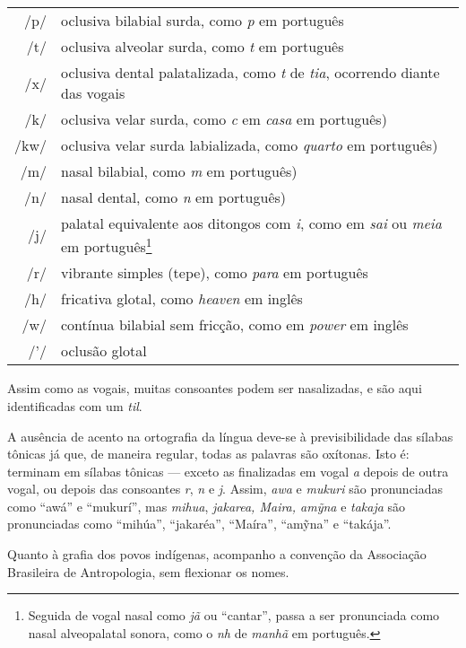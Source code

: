 \begin{tabular}{rl}
/p/ & oclusiva bilabial surda, como \textit{p} em português\\
/t/ & oclusiva alveolar surda, como \textit{t} em português\\
/x/ & oclusiva dental palatalizada, como \textit{t} de \textit{tia}, ocorrendo diante das vogais\\
/k/ & oclusiva velar surda, como \textit{c} em \textit{casa} em português)\\
/kw/ & oclusiva velar surda labializada, como \textit{quarto} em português)\\
/m/ & nasal bilabial, como \textit{m} em português)\\
/n/ & nasal dental, como \textit{n} em português)\\
/j/ & palatal equivalente aos ditongos com \textit{i}, como em \textit{sai} ou \textit{meia} em português\footnote{Seguida de vogal nasal como \textit{jã} ou ``cantar'', passa a ser pronunciada como nasal alveopalatal sonora, como o \textit{nh} de \textit{manhã} em português.}\\
/r/ & vibrante simples (tepe), como \textit{para} em português\\
/h/ & fricativa glotal, como \textit{heaven} em inglês\\
/w/ & contínua bilabial sem fricção, como em \textit{power} em inglês\\
/'/ & oclusão glotal
\end{tabular}


Assim como as vogais, muitas consoantes podem ser nasalizadas, e são
aqui identificadas com um \textit{til}.

A ausência de acento na ortografia da língua deve-se à previsibilidade
das sílabas tônicas já que, de maneira regular, todas as palavras são
oxítonas. Isto é: terminam em sílabas tônicas --- exceto as finalizadas em
vogal \textit{a} depois de outra vogal, ou depois das consoantes \textit{r}, \textit{n} e \textit{j}.
Assim, \textit{awa} e \textit{mukuri} são pronunciadas como ``awá'' e
``mukurí'', mas \textit{mihua}, \textit{jakarea, Maira, amỹna} e \textit{takaja} são
pronunciadas como ``mihúa'', ``jakaréa'', ``Maíra'', ``amỹna'' e
``takája''.

Quanto à grafia dos povos indígenas, acompanho a convenção da Associação Brasileira de Antropologia, sem flexionar os nomes.


